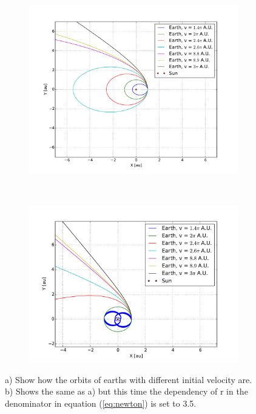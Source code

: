 \begin{figure}[H]
    \centering
    \begin{subfigure}{0.5\textwidth}
        \centering
        \includegraphics[width=\linewidth]{result/bilder/escape-velocity.pdf}
    	\caption{}
    \end{subfigure}%
    ~ 
    \begin{subfigure}{0.5\textwidth}
        \centering
        \includegraphics[width=\linewidth]{result/bilder/escape-velocity-r25.pdf}
        \caption{}
    \end{subfigure}
    \caption{a) Show how the orbits of earths with different initial velocity are. b) Shows the same as a) but this time the dependency of r in the denominator in equation (\ref{eq:newton}) is set to 3.5.}
    \label{fig:escape-velocity-low}
\end{figure}




